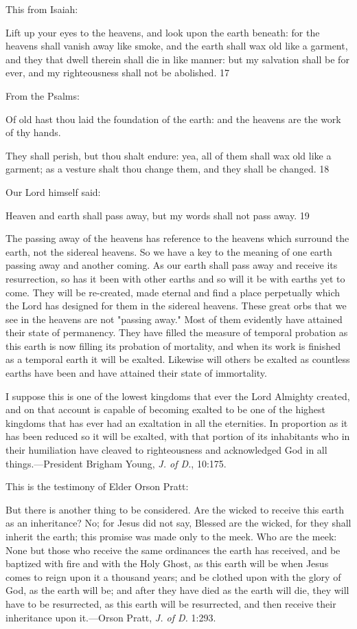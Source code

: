 This from Isaiah:

Lift up your eyes to the heavens, and look upon the earth beneath: for the heavens shall
vanish away like smoke, and the earth shall wax old like a garment, and they that dwell
therein shall die in like manner: but my salvation shall be for ever, and my righteousness
shall not be abolished. 17

From the Psalms:

Of old hast thou laid the foundation of the earth: and the heavens are the work of thy hands.

They shall perish, but thou shalt endure: yea, all of them shall wax old like a garment; as a
vesture shalt thou change them, and they shall be changed. 18

Our Lord himself said:

Heaven and earth shall pass away, but my words shall not pass away. 19

The passing away of the heavens has reference to the heavens which surround the earth, not
the sidereal heavens. So we have a key to the meaning of one earth passing away and another
coming. As our earth shall pass away and receive its resurrection, so has it been with other
earths and so will it be with earths yet to come. They will be re-created, made eternal and
find a place perpetually which the Lord has designed for them in the sidereal heavens. These
great orbs that we see in the heavens are not "passing away." Most of them evidently have
attained their state of permanency. They have filled the measure of temporal probation as this
earth is now filling its probation of mortality, and when its work is finished as a temporal
earth it will be exalted. Likewise will others be exalted as countless earths have been and
have attained their state of immortality.

I suppose this is one of the lowest kingdoms that ever the Lord Almighty created, and on that
account is capable of becoming exalted to be one of the highest kingdoms that has ever had
an exaltation in all the eternities. In proportion as it has been reduced so it will be exalted,
with that portion of its inhabitants who in their humiliation have cleaved to righteousness and
acknowledged God in all things.—President Brigham Young, \textit{J. of D.}, 10:175.

This is the testimony of Elder Orson Pratt:

But there is another thing to be considered. Are the wicked to receive this earth as an
inheritance? No; for Jesus did not say, Blessed are the wicked, for they shall inherit the earth;
this promise was made only to the meek. Who are the meek: None but those who receive the
same ordinances the earth has received, and be baptized with fire and with the Holy Ghost, as
this earth will be when Jesus comes to reign upon it a thousand years; and be clothed upon
with the glory of God, as the earth will be; and after they have died as the earth will die, they
will have to be resurrected, as this earth will be resurrected, and then receive their inheritance
upon it.—Orson Pratt, \textit{J. of D.} 1:293.

